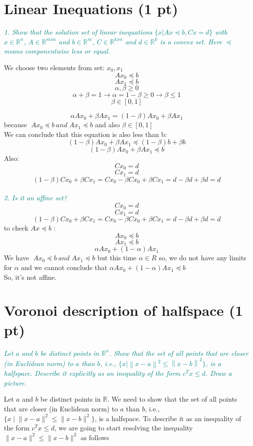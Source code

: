 \documentclass[onecolumn]{article}
\begin{document}
\section{Linear Inequations (1 pt)}
\textcolor{teal}{\emph{1. Show that the solution set of linear inequations $\{x | Ax \preceq b, Cx = d\}$ with $x \in \mathbb{R}^n$, $A \in \mathbb{R}^{mxn}$ and $b \in \mathbb{R}^m$, $C \in \mathbb{R}^{kxn}$ and $d \in \mathbb{R}^k$ is a convex set. Here $\preceq$ means componentwise less or equal. }}

We choose two elements from set:  $x_0, x_1$ 
\[A x_0 \preceq b\]
\[A x_1 \preceq b\]
\[\alpha , \beta \geq 0\]
\[\alpha + \beta = 1 \xrightarrow{ } \alpha = 1- \beta \geq 0  \xrightarrow{} \beta \leq 1\]
\[ \beta \in [0,1] \]

\[\alpha A x_0 + \beta A x_1= (1-\beta) A x_0 + \beta A x_1 \] 
because $ \; A x_0 \preceq b\ and \; A x_1 \preceq b $ and also $ \beta \in [0,1] $
\\
We can conclude that this equation is also less than b:
\[(1-\beta) A x_0 + \beta A x_1 \preceq  (1-\beta) b + \beta b\] 
\[(1-\beta) A x_0 + \beta A x_1 \preceq  b\] 
Also:
\[C x_0 = d\]
\[C x_1 = d\]
\[ (1-\beta)C x_0 +\beta C x_1 = C x_0 - \beta C x_0 +\beta C x_1 = d - \beta d +\beta d = d\]
\\
\textcolor{teal}{\emph{2. Is it an affine set?}}
\[C x_0 = d\]
\[C x_1 = d\]
\[ (1-\beta)C x_0 +\beta C x_1 = C x_0 - \beta C x_0 +\beta C x_1 = d - \beta d +\beta d = d\]
to check $A x \preceq b$ :
\[A x_0 \preceq b\]
\[A x_1 \preceq b\]
\[\alpha A x_0 + (1-\alpha)A x_1\]
We have $ \; A x_0 \preceq b\ and \; A x_1 \preceq b $ but this time $\alpha \in R $ so, we do not have any limits for $\alpha$ and we cannot conclude that $\alpha A x_0 + (1-\alpha) A x_1 \preceq  b $
\\
So, it's not affine.


\section{Voronoi description of halfspace (1 pt)}
\textcolor{teal}{\emph{Let $a$ and $b$ be distinct points in $\mathbb{R}^n$. Show that the set of all points that are closer (in Euclidean norm) to $a$ than $b$, i.e., $\{x | \left\lVert x − a\right\rVert ^2 \le \left\lVert x − b\right\rVert ^2\}$, is a halfspace. Describe it explicitly as an inequality of the form $c^T x \le d$. Draw a picture.}}

Let $a$ and $b$ be distinct points in $\mathbb{R}$. We need to show that the set of all points that are closer (in Euclidean norm) to $a$ than $b$, i.e., $\{x \mid \lVert x − a \rVert ^2 \leq \lVert x − b \rVert ^2 \}$, is a halfspace. \hfill \break 
To describe it as an inequality of the form $c^T x \leq d$, we are going to start resolving the inequality $\lVert x − a \rVert ^2 \leq \lVert x − b \rVert ^2$ as follows 
\end{document}
